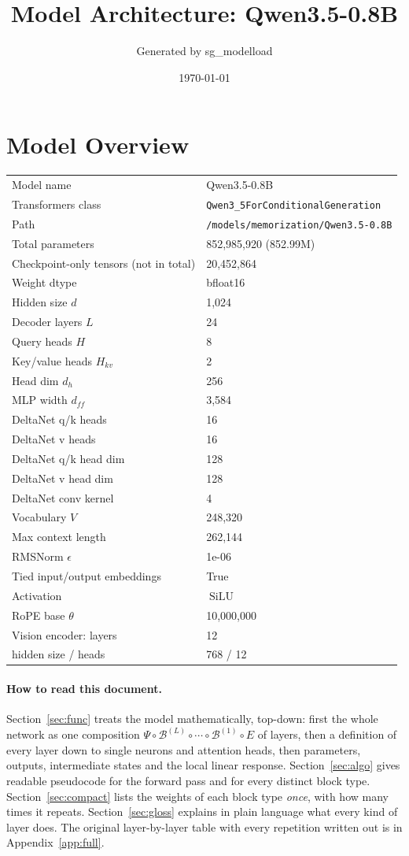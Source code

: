 \documentclass[10pt,a4paper]{article}
\title{Model Architecture: Qwen3.5-0.8B}
\author{Generated by sg\_modelload}
\date{\today}
\newcommand{\op}[1]{\operatorname{#1}}
\theoremstyle{definition}
\begin{document}
\maketitle
\tableofcontents
\clearpage
\section{Model Overview}
\begin{tabular}{ll}
\toprule
Model name & Qwen3.5-0.8B \\
Transformers class & \texttt{Qwen3\_5ForConditionalGeneration} \\
Path & \texttt{/models/memorization/Qwen3.\allowbreak{}5-0.\allowbreak{}8B} \\
Total parameters & 852,985,920 (852.99M) \\
Checkpoint-only tensors (not in total) & 20,452,864 \\
Weight dtype & bfloat16 \\
\midrule
Hidden size $d$ & 1,024 \\
Decoder layers $L$ & 24 \\
Query heads $H$ & 8 \\
Key/value heads $H_{kv}$ & 2 \\
Head dim $d_h$ & 256 \\
MLP width $d_{ff}$ & 3,584 \\
DeltaNet q/k heads & 16 \\
DeltaNet v heads & 16 \\
DeltaNet q/k head dim & 128 \\
DeltaNet v head dim & 128 \\
DeltaNet conv kernel & 4 \\
Vocabulary $V$ & 248,320 \\
Max context length & 262,144 \\
RMSNorm $\epsilon$ & 1e-06 \\
Tied input/output embeddings & True \\
Activation & $\op{SiLU}$ \\
RoPE base $\theta$ & 10,000,000 \\
\midrule
Vision encoder: layers & 12 \\
\quad hidden size / heads & 768 / 12 \\
\bottomrule
\end{tabular}

\paragraph{How to read this document.} Section~\ref{sec:func} treats the model mathematically, top-down: first the whole network as one composition $\Psi\circ\mathcal{B}^{(L)}\circ\cdots\circ\mathcal{B}^{(1)}\circ E$ of layers, then a definition of every layer down to single neurons and attention heads, then parameters, outputs, intermediate states and the local linear response. Section~\ref{sec:algo} gives readable pseudocode for the forward pass and for every distinct block type. Section~\ref{sec:compact} lists the weights of each block type \emph{once}, with how many times it repeats. Section~\ref{sec:gloss} explains in plain language what every kind of layer does. The original layer-by-layer table with every repetition written out is in Appendix~\ref{app:full}.
\end{document}
